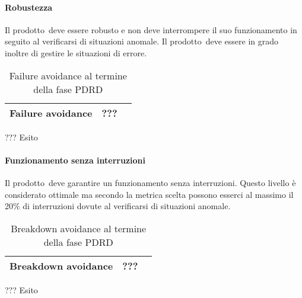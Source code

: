 \documentclass[../PianoDiQualifica.tex]{subfiles}
\begin{document}
\begin{appendices}
			\paragraph{Robustezza}
				Il prodotto\g\ deve essere robusto e non deve interrompere il suo funzionamento in seguito al verificarsi di situazioni anomale\g. Il prodotto\g\ deve essere in grado inoltre di gestire le situazioni di errore.
			\begin{table}[H]
				\centering
				\begin{tabular}{l * {2}{c}}
					\midrule
					Failure avoidance & ??? \\
					\midrule
				\end{tabular}
				\caption{Failure avoidance al termine della fase PDRD}
				\label{tab:failure_avoidance}
			\end{table}
			
			??? Esito
			
			\paragraph{Funzionamento senza interruzioni}
				Il prodotto\g\ deve garantire un funzionamento senza interruzioni. Questo livello è considerato ottimale ma secondo la metrica scelta possono esserci al massimo il 20\% di interruzioni dovute al verificarsi di situazioni anomale\g.
			\begin{table}[H]
				\centering
				\begin{tabular}{l * {2}{c}}
					\midrule
					Breakdown avoidance & ??? \\
					\midrule
				\end{tabular}
				\caption{Breakdown avoidance al termine della fase PDRD}
				\label{tab:breackdown_avoidance}
			\end{table}	
			
			??? Esito
				
	
\end{appendices}
\end{document}
